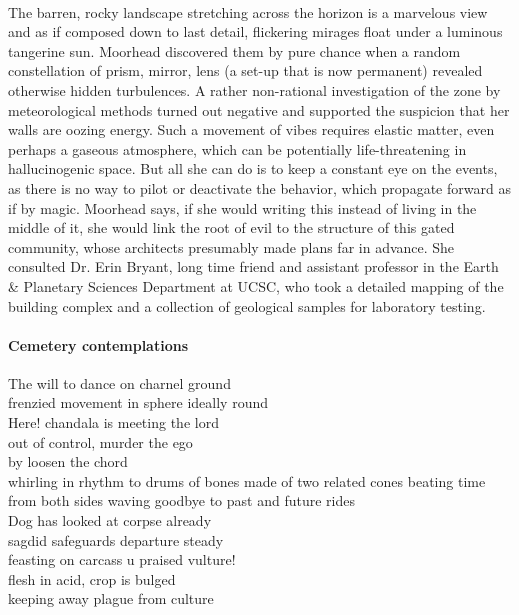 \documentclass{article}
\begin{document}
\paragraph{}
The barren, rocky landscape stretching across the horizon
is a marvelous view and as if composed down to last detail,
flickering mirages float under a luminous tangerine sun.
Moorhead discovered them by pure chance 
when a random constellation of prism, mirror, lens
(a set-up that is now permanent) revealed 
otherwise hidden turbulences.
A rather non-rational investigation of the zone 
by meteorological methods turned out negative 
and supported the suspicion
that her walls are oozing energy.
Such a movement of vibes requires elastic matter,
even perhaps a gaseous atmosphere, which can be potentially 
life-threatening in hallucinogenic space.
But all she can do is to keep a constant eye on the events, 
as there is no way to pilot or deactivate the behavior,
which propagate forward as if by magic. 
Moorhead says, if she would writing this instead of 
living in the middle of it,
she would link the root of evil to the structure of this gated community, whose architects presumably made plans far in advance.
She consulted Dr. Erin Bryant, long time friend and assistant professor
in the Earth \& Planetary Sciences Department at UCSC, 
who took a detailed mapping of the building complex
and a collection of geological samples for laboratory testing. 

\paragraph{Cemetery contemplations}
The will to dance on charnel ground \\
frenzied movement in sphere ideally round \\
Here! chandala is meeting the lord \\
out of control, murder the ego \\ 
by loosen the chord \\

whirling in rhythm to drums of bones 
made of two related cones
beating time from both sides 
waving goodbye to past and future rides \\

Dog has looked at corpse already \\
sagdid safeguards departure steady \\ 
feasting on carcass u praised vulture! \\
flesh in acid, crop is bulged \\
keeping away plague from culture \\
\end{document}
